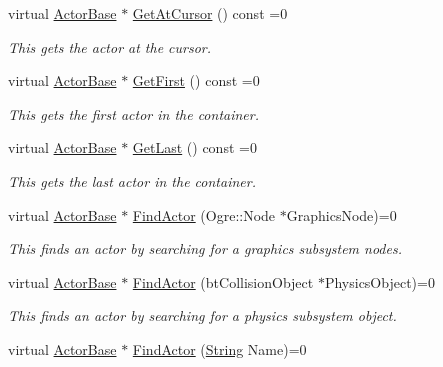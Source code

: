 \begin{DoxyCompactItemize}
virtual \hyperlink{classphys_1_1ActorBase}{ActorBase} $\ast$ \hyperlink{classphys_1_1ActorContainerBase_a2c8fb86a9e188aece105b2a753ccc19a}{GetAtCursor} () const =0
\begin{DoxyCompactList}\small\item\em This gets the actor at the cursor. \item\end{DoxyCompactList}\item 
virtual \hyperlink{classphys_1_1ActorBase}{ActorBase} $\ast$ \hyperlink{classphys_1_1ActorContainerBase_ae703482d84a9c6726e28a8f26418b161}{GetFirst} () const =0
\begin{DoxyCompactList}\small\item\em This gets the first actor in the container. \item\end{DoxyCompactList}\item 
virtual \hyperlink{classphys_1_1ActorBase}{ActorBase} $\ast$ \hyperlink{classphys_1_1ActorContainerBase_a8efeffd5ae22085fe01af791b3ea559e}{GetLast} () const =0
\begin{DoxyCompactList}\small\item\em This gets the last actor in the container. \item\end{DoxyCompactList}\item 
virtual \hyperlink{classphys_1_1ActorBase}{ActorBase} $\ast$ \hyperlink{classphys_1_1ActorContainerBase_a2e4652bf92f24a0ff20bdc4a7173b567}{FindActor} (Ogre::Node $\ast$GraphicsNode)=0
\begin{DoxyCompactList}\small\item\em This finds an actor by searching for a graphics subsystem nodes. \item\end{DoxyCompactList}\item 
virtual \hyperlink{classphys_1_1ActorBase}{ActorBase} $\ast$ \hyperlink{classphys_1_1ActorContainerBase_a9ba6e38e0f12ada968cfee72fe5144d4}{FindActor} (btCollisionObject $\ast$PhysicsObject)=0
\begin{DoxyCompactList}\small\item\em This finds an actor by searching for a physics subsystem object. \item\end{DoxyCompactList}\item 
virtual \hyperlink{classphys_1_1ActorBase}{ActorBase} $\ast$ \hyperlink{classphys_1_1ActorContainerBase_a91223cbaebb8e5f11a4f971d7e5b64b6}{FindActor} (\hyperlink{namespacephys_aa03900411993de7fbfec4789bc1d392e}{String} Name)=0

\end{DoxyCompactItemize}
